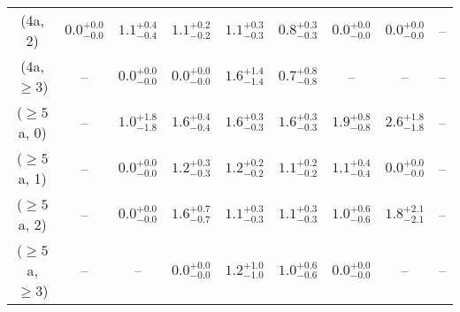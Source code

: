 \begin{table}[h!]
{\begin{tabular}{ccccccccc}
	(4a, 2) & $0.0^{+ 0.0 }_{- 0.0 }$ & $1.1^{+ 0.4 }_{- 0.4 }$ & $1.1^{+ 0.2 }_{- 0.2 }$ & $1.1^{+ 0.3 }_{- 0.3 }$ & $0.8^{+ 0.3 }_{- 0.3 }$ & $0.0^{+ 0.0 }_{- 0.0 }$ & $0.0^{+ 0.0 }_{- 0.0 }$ & -- \\[0.5ex] 
	(4a, $\ge3$) & -- & $0.0^{+ 0.0 }_{- 0.0 }$ & $0.0^{+ 0.0 }_{- 0.0 }$ & $1.6^{+ 1.4 }_{- 1.4 }$ & $0.7^{+ 0.8 }_{- 0.8 }$ & -- & -- & -- \\[0.5ex] 
	($\ge5$a, 0) & -- & $1.0^{+ 1.8 }_{- 1.8 }$ & $1.6^{+ 0.4 }_{- 0.4 }$ & $1.6^{+ 0.3 }_{- 0.3 }$ & $1.6^{+ 0.3 }_{- 0.3 }$ & $1.9^{+ 0.8 }_{- 0.8 }$ & $2.6^{+ 1.8 }_{- 1.8 }$ & -- \\[0.5ex] 
	($\ge5$a, 1) & -- & $0.0^{+ 0.0 }_{- 0.0 }$ & $1.2^{+ 0.3 }_{- 0.3 }$ & $1.2^{+ 0.2 }_{- 0.2 }$ & $1.1^{+ 0.2 }_{- 0.2 }$ & $1.1^{+ 0.4 }_{- 0.4 }$ & $0.0^{+ 0.0 }_{- 0.0 }$ & -- \\[0.5ex] 
	($\ge5$a, 2) & -- & $0.0^{+ 0.0 }_{- 0.0 }$ & $1.6^{+ 0.7 }_{- 0.7 }$ & $1.1^{+ 0.3 }_{- 0.3 }$ & $1.1^{+ 0.3 }_{- 0.3 }$ & $1.0^{+ 0.6 }_{- 0.6 }$ & $1.8^{+ 2.1 }_{- 2.1 }$ & -- \\[0.5ex] 
	($\ge5$a, $\ge3$) & -- & -- & $0.0^{+ 0.0 }_{- 0.0 }$ & $1.2^{+ 1.0 }_{- 1.0 }$ & $1.0^{+ 0.6 }_{- 0.6 }$ & $0.0^{+ 0.0 }_{- 0.0 }$ & -- & -- \\[0.5ex] 
	\hline
	\hline
\end{tabular}}
\end{table}
